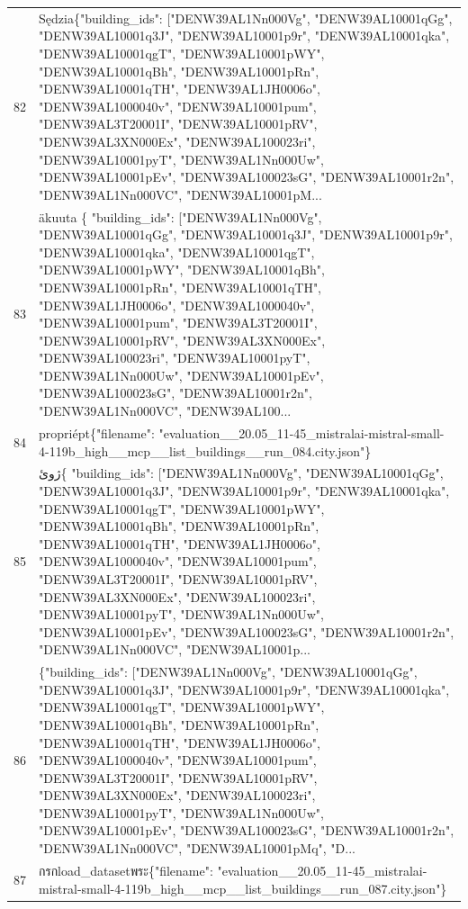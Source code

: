 \documentclass[a4paper,11pt]{article}
\begin{document}
\begin{table}[ht]
\begin{tabular}{r p{12cm}}
82 & Sędzia\{"building\_ids": ["DENW39AL1Nn000Vg", "DENW39AL10001qGg", "DENW39AL10001q3J", "DENW39AL10001p9r", "DENW39AL10001qka", "DENW39AL10001qgT", "DENW39AL10001pWY", "DENW39AL10001qBh", "DENW39AL10001pRn", "DENW39AL10001qTH", "DENW39AL1JH0006o", "DENW39AL1000040v", "DENW39AL10001pum", "DENW39AL3T20001I", "DENW39AL10001pRV", "DENW39AL3XN000Ex", "DENW39AL100023ri", "DENW39AL10001pyT", "DENW39AL1Nn000Uw", "DENW39AL10001pEv", "DENW39AL100023sG", "DENW39AL10001r2n", "DENW39AL1Nn000VC", "DENW39AL10001pM... \\
83 & äkuuta
\{
  "building\_ids": ["DENW39AL1Nn000Vg", "DENW39AL10001qGg", "DENW39AL10001q3J", "DENW39AL10001p9r", "DENW39AL10001qka", "DENW39AL10001qgT", "DENW39AL10001pWY", "DENW39AL10001qBh", "DENW39AL10001pRn", "DENW39AL10001qTH", "DENW39AL1JH0006o", "DENW39AL1000040v", "DENW39AL10001pum", "DENW39AL3T20001I", "DENW39AL10001pRV", "DENW39AL3XN000Ex", "DENW39AL100023ri", "DENW39AL10001pyT", "DENW39AL1Nn000Uw", "DENW39AL10001pEv", "DENW39AL100023sG", "DENW39AL10001r2n", "DENW39AL1Nn000VC", "DENW39AL100... \\
84 &  propriépt\{"filename": "evaluation\_\_20.05\_11-45\_mistralai-mistral-small-4-119b\_high\_\_mcp\_\_list\_buildings\_\_run\_084.city.json"\} \\
85 &  ژوئ\{
  "building\_ids": ["DENW39AL1Nn000Vg", "DENW39AL10001qGg", "DENW39AL10001q3J", "DENW39AL10001p9r", "DENW39AL10001qka", "DENW39AL10001qgT", "DENW39AL10001pWY", "DENW39AL10001qBh", "DENW39AL10001pRn", "DENW39AL10001qTH", "DENW39AL1JH0006o", "DENW39AL1000040v", "DENW39AL10001pum", "DENW39AL3T20001I", "DENW39AL10001pRV", "DENW39AL3XN000Ex", "DENW39AL100023ri", "DENW39AL10001pyT", "DENW39AL1Nn000Uw", "DENW39AL10001pEv", "DENW39AL100023sG", "DENW39AL10001r2n", "DENW39AL1Nn000VC", "DENW39AL10001p... \\
86 & \{"building\_ids": ["DENW39AL1Nn000Vg", "DENW39AL10001qGg", "DENW39AL10001q3J", "DENW39AL10001p9r", "DENW39AL10001qka", "DENW39AL10001qgT", "DENW39AL10001pWY", "DENW39AL10001qBh", "DENW39AL10001pRn", "DENW39AL10001qTH", "DENW39AL1JH0006o", "DENW39AL1000040v", "DENW39AL10001pum", "DENW39AL3T20001I", "DENW39AL10001pRV", "DENW39AL3XN000Ex", "DENW39AL100023ri", "DENW39AL10001pyT", "DENW39AL1Nn000Uw", "DENW39AL10001pEv", "DENW39AL100023sG", "DENW39AL10001r2n", "DENW39AL1Nn000VC", "DENW39AL10001pMq", "D... \\
87 &  กรกload\_datasetพระ\{"filename": "evaluation\_\_20.05\_11-45\_mistralai-mistral-small-4-119b\_high\_\_mcp\_\_list\_buildings\_\_run\_087.city.json"\} \\

\end{tabular}
\end{table}
\end{document}
